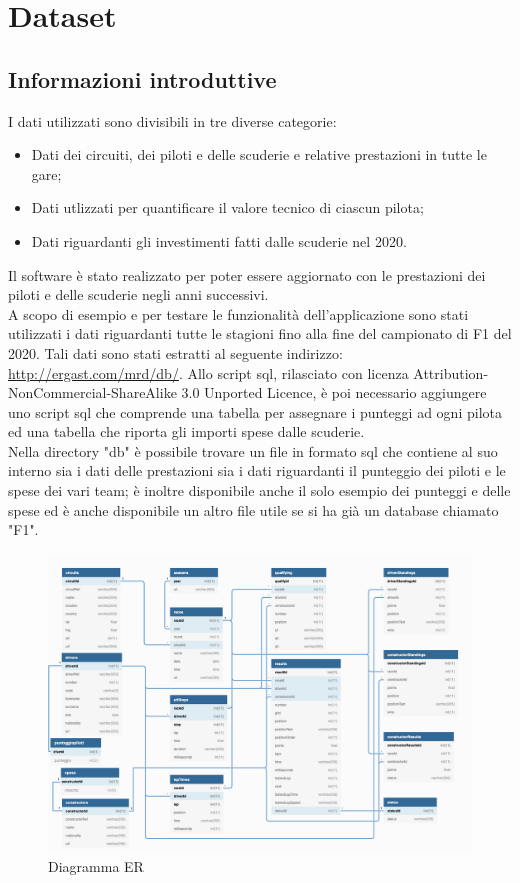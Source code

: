 \chapter{Dataset}
\label{sec:dataset}


\section[Informazioni introduttive]{Informazioni introduttive} %
I dati utilizzati sono divisibili in tre diverse categorie:
\begin{itemize}
\item  Dati dei circuiti, dei piloti e delle scuderie e relative prestazioni in tutte le gare;
\item  Dati utlizzati per quantificare il valore tecnico di ciascun pilota;
\item  Dati riguardanti gli investimenti fatti dalle scuderie nel 2020.
\end{itemize}
Il software è stato realizzato per poter essere aggiornato con le prestazioni dei piloti e delle scuderie negli anni successivi.\\
A scopo di esempio e per testare le funzionalità dell'applicazione sono stati utilizzati i dati riguardanti tutte le stagioni fino alla fine del campionato di F1 del 2020. Tali dati sono stati estratti al seguente indirizzo: \href{http://ergast.com/mrd/db/}{http://ergast.com/mrd/db/}. Allo script sql, rilasciato con licenza Attribution-NonCommercial-ShareAlike 3.0 Unported Licence, è poi necessario aggiungere uno script sql che comprende una tabella per assegnare i punteggi ad ogni pilota ed una tabella che riporta gli importi spese dalle scuderie.\\
Nella directory "db" è possibile trovare un file in formato sql che contiene al suo interno sia i dati delle prestazioni sia i dati riguardanti il punteggio dei piloti e le spese dei vari team; è inoltre disponibile anche il solo esempio dei punteggi e delle spese ed è anche disponibile un altro file utile se si ha già un database chiamato "F1".

\begin{figure}[h]
\centering
\includegraphics[width=1\linewidth]{images/Diagramma ER.png}
\caption{Diagramma ER}
\label{fig:Diagramma ER}
\end{figure}

